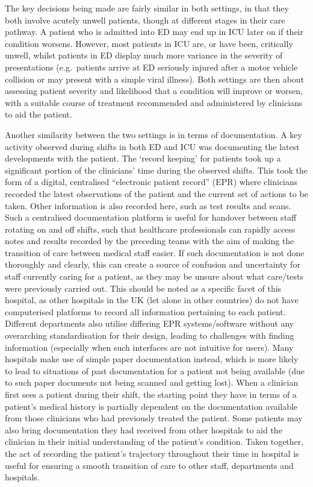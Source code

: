 \documentclass[a4paper, nobind]{templates/ociamthesis}
\begin{document}
\hfill\break
The key decisions being made are fairly similar in both settings, in that they both involve acutely unwell patients, though at different stages in their care pathway. A patient who is admitted into ED may end up in ICU later on if their condition worsens. However, most patients in ICU are, or have been, critically unwell, whilst patients in ED display much more variance in the severity of presentations (e.g.~patients arrive at ED seriously injured after a motor vehicle collision or may present with a simple viral illness). Both settings are then about assessing patient severity and likelihood that a condition will improve or worsen, with a suitable course of treatment recommended and administered by clinicians to aid the patient.

\hfill\break
Another similarity between the two settings is in terms of documentation. A key activity observed during shifts in both ED and ICU was documenting the latest developments with the patient. The `record keeping' for patients took up a significant portion of the clinicians' time during the observed shifts. This took the form of a digital, centralised ``electronic patient record'' (EPR) where clinicians recorded the latest observations of the patient and the current set of actions to be taken. Other information is also recorded here, such as test results and scans. Such a centralised documentation platform is useful for handover between staff rotating on and off shifts, such that healthcare professionals can rapidly access notes and results recorded by the preceding teams with the aim of making the transition of care between medical staff easier. If such documentation is not done thoroughly and clearly, this can create a source of confusion and uncertainty for staff currently caring for a patient, as they may be unsure about what care/tests were previously carried out. This should be noted as a specific facet of this hospital, as other hospitals in the UK (let alone in other countries) do not have computerised platforms to record all information pertaining to each patient. Different departments also utilise differing EPR systems/software without any overarching standardisation for their design, leading to challenges with finding information (especially when such interfaces are not intuitive for users). Many hospitals make use of simple paper documentation instead, which is more likely to lead to situations of past documentation for a patient not being available (due to such paper documents not being scanned and getting lost). When a clinician first sees a patient during their shift, the starting point they have in terms of a patient's medical history is partially dependent on the documentation available from those clinicians who had previously treated the patient. Some patients may also bring documentation they had received from other hospitals to aid the clinician in their initial understanding of the patient's condition. Taken together, the act of recording the patient's trajectory throughout their time in hospital is useful for ensuring a smooth transition of care to other staff, departments and hospitals.
\end{document}
